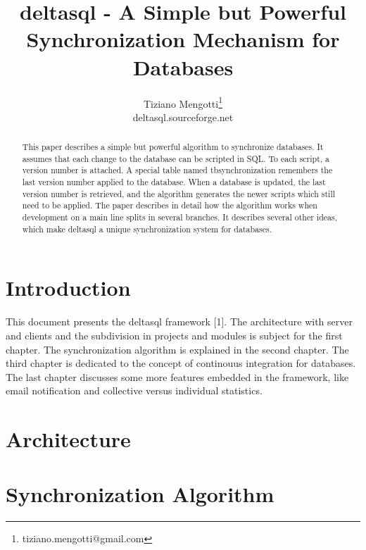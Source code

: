 \documentclass[10pt,a4paper]{article}
\begin{document}
\pagestyle{headings}

\title{deltasql - A Simple but Powerful Synchronization Mechanism for Databases}

\author{Tiziano Mengotti\thanks{tiziano.mengotti@gmail.com}\\
deltasql.sourceforge.net\\}

\maketitle
\thispagestyle{empty}

\begin{abstract}
This paper describes a simple but powerful algorithm to synchronize databases. It assumes that each change to the database can be scripted in SQL. To each script, a version number is attached. A special table named tbsynchronization remembers the last version number applied to the database. When a database is updated, the last version number is retrieved, and the algorithm generates the newer scripts which still need to be applied. The paper describes in detail how the algorithm works when development on a main line splits in several branches. It describes several other ideas, which make deltasql a unique synchronization system for databases. 
\end{abstract}


\section{Introduction}
\label{sec:intro}
This document presents the deltasql framework [1]. The architecture with server and clients and the subdivision in projects and modules is subject for the first chapter. The synchronization algorithm is explained in the second chapter. The third chapter is dedicated to the concept of continouus integration for databases. The last chapter discusses some more features embedded in the framework, like email notification and collective versus individual statistics.


\section{Architecture}

\section{Synchronization Algorithm}
\end{document}
